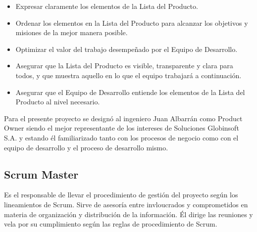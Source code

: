        \begin{itemize}
            \item Expresar claramente los elementos de la Lista del Producto.
            \item Ordenar los elementos en la Lista del Producto para alcanzar los objetivos y misiones de la mejor manera posible.
            \item Optimizar el valor del trabajo desempeñado por el Equipo de Desarrollo.
            \item Asegurar que la Lista del Producto es visible, transparente y clara para todos, y que muestra aquello en lo que el equipo trabajará a continuación.
            \item Asegurar que el Equipo de Desarrollo entiende los elementos de la Lista del Producto al nivel necesario.
        \end{itemize}
               
        Para el presente proyecto se designó al ingeniero Juan Albarrán como Product Owner siendo el mejor representante de los intereses de Soluciones Globinsoft S.A. y estando él familiarizado tanto con los procesos de negocio como con el equipo de desarrollo y el proceso de desarrollo mismo.
        
        \subsection{Scrum Master}
        \label{scrum-master}
        
        Es el responsable de llevar el procedimiento de gestión del proyecto según los lineamientos de Scrum. Sirve de asesoría entre invloucrados y comprometidos en materia de organización y distribución de la información. Él dirige las reuniones y vela por su cumplimiento según las reglas de procedimiento de Scrum.
        
